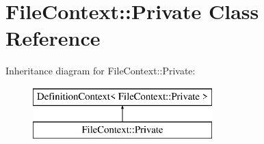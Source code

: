 \hypertarget{class_file_context_1_1_private}{}\section{File\+Context\+::Private Class Reference}
\label{class_file_context_1_1_private}
Inheritance diagram for File\+Context\+::Private\+:\begin{figure}[H]
\begin{center}
\leavevmode
\includegraphics[height=2.000000cm]{class_file_context_1_1_private}
\end{center}
\end{figure}
